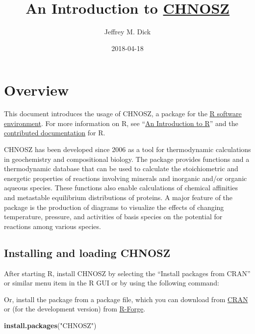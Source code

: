 \documentclass[]{tufte-book}
\title{An Introduction to \href{http://www.chnosz.net}{CHNOSZ}}
\author{Jeffrey M. Dick}
\date{2018-04-18}
\newenvironment{Shaded}{}{}
\newcommand{\KeywordTok}[1]{\textcolor[rgb]{0.00,0.44,0.13}{\textbf{#1}}}
\newcommand{\StringTok}[1]{\textcolor[rgb]{0.25,0.44,0.63}{#1}}
\newcommand{\NormalTok}[1]{#1}
\begin{document}
\maketitle




\chapter{Overview}\label{overview}

This document introduces the usage of CHNOSZ, a package for the
\href{http://r-project.org}{R software environment}. For more
information on R, see
``\href{https://cran.r-project.org/manuals.html}{An Introduction to R}''
and the \href{https://cran.r-project.org/other-docs.html}{contributed
documentation} for R.

CHNOSZ has been developed since 2006 as a tool for thermodynamic
calculations in geochemistry and compositional biology. The package
provides functions and a thermodynamic database that can be used to
calculate the stoichiometric and energetic properties of reactions
involving minerals and inorganic and/or organic aqueous species. These
functions also enable calculations of chemical affinities and metastable
equilibrium distributions of proteins. A major feature of the package is
the production of diagrams to visualize the effects of changing
temperature, pressure, and activities of basis species on the potential
for reactions among various species.

\section{Installing and loading
CHNOSZ}\label{installing-and-loading-chnosz}

After starting R, install CHNOSZ by selecting the ``Install packages
from CRAN'' or similar menu item in the R GUI or by using the following
command:

\begin{marginfigure}
Or, install the package from a package file, which you can download from
\href{https://cran.r-project.org/package=CHNOSZ}{CRAN} or (for the
development version) from
\href{https://r-forge.r-project.org/projects/chnosz/}{R-Forge}.
\end{marginfigure}

\begin{Shaded}
\begin{Highlighting}[]
\KeywordTok{install.packages}\NormalTok{(}\StringTok{"CHNOSZ"}\NormalTok{)}
\end{Highlighting}
\end{Shaded}
\end{document}
